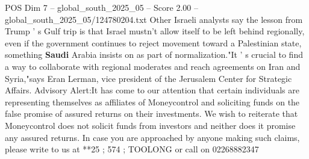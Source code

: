 \begin{textsample}{POS Dim 7 – global\_south\_2025\_05 – Score 2.00 – global\_south\_2025\_05/124780204.txt}
Other Israeli analysts say the lesson from Trump ' s Gulf trip is that Israel mustn't allow itself to be left behind regionally, even if the government continues to reject movement toward a Palestinian state, something \textbf{Saudi} Arabia insists on as part of normalization."It ' s crucial to find a way to collaborate with regional moderates and reach agreements on Iran and Syria,"says Eran Lerman, vice president of the Jerusalem Center for Strategic Affairs.
Advisory Alert:It has come to our attention that certain individuals are representing themselves as affiliates of Moneycontrol and soliciting funds on the false promise of assured returns on their investments.
We wish to reiterate that Moneycontrol does not solicit funds from investors and neither does it promise any assured returns.
In case you are approached by anyone making such claims, please write to us at **25 ; 574 ; TOOLONG or call on 02268882347

\end{textsample}
